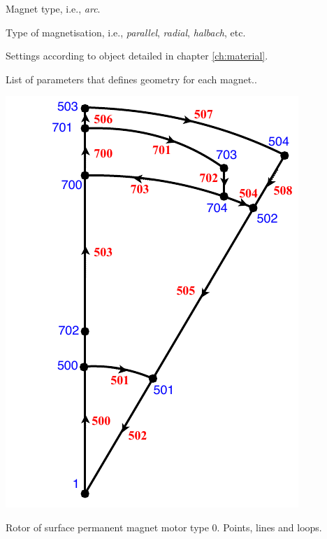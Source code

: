 \documentclass[justified]{tufte-book} %
\begin{document}
\begin{description}[leftmargin=4.5cm, style=nextline]
\item[\normalfont{\ttfamily{\textbf{type}}: \textit{String}}] Magnet type, i.e., \textit{arc}.
\item[\normalfont{\ttfamily{\textbf{magnetisation}}: \textit{String}}] Type of magnetisation, i.e., \textit{parallel}, \textit{radial}, \textit{halbach}, etc.
\item[\normalfont{\ttfamily{\textbf{material}}: \textit{Object}}] Settings according to object detailed in chapter \ref{ch:material}.
\item[\normalfont{\ttfamily{\textbf{dimension}}: \textit{Array}}] List of parameters that defines geometry for each magnet..
\end{description}

\begin{marginfigure}
\includegraphics[width=\linewidth]{SPM_0.pdf}
\caption{Rotor of surface permanent magnet motor type $0$. Points, lines and loops.}
\label{fig:spm0}
\end{marginfigure}
\end{document}
